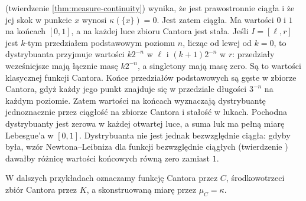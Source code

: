 \begin{przyklad}
(twierdzenie \ref{thm:measure-continuity}) wynika, że jest
prawostronnie ciągła i że jej skok w punkcie $x$ wynosi
$\kappa(\{x\})=0$. Jest zatem ciągła. Ma wartości $0$ i $1$
na końcach $[0,1]$, a na każdej luce zbioru Cantora jest stała. Jeśli $I=[\ell,r]$ jest $k$-tym przedziałem
podstawowym poziomu $n$, licząc od lewej od $k=0$,
to dystrybuanta przyjmuje wartości $k2^{-n}$ w $\ell$
i $(k+1)2^{-n}$ w $r$: przedziały wcześniejsze mają
łącznie masę $k2^{-n}$, a singletony mają masę zero.
Są to wartości klasycznej funkcji Cantora. Końce
przedziałów podstawowych są gęste w zbiorze Cantora,
gdyż każdy jego punkt znajduje się w przedziale
długości $3^{-n}$ na każdym poziomie. Zatem wartości
na końcach wyznaczają dystrybuantę jednoznacznie
przez ciągłość na zbiorze Cantora i stałość w lukach.
Pochodna dystrybuanty jest zerowa w każdej otwartej
luce, a suma luk ma pełną miarę Lebesgue'a w $[0,1]$.
Dystrybuanta nie jest jednak bezwzględnie ciągła:
gdyby była, wzór Newtona--Leibniza dla funkcji
bezwzględnie ciągłych
(twierdzenie )
dawałby różnicę wartości końcowych równą zero zamiast $1$.
\end{przyklad}

W dalszych przykładach oznaczamy funkcję Cantora przez $C$, środkowotrzeci zbiór Cantora przez $K$, a skonstruowaną miarę przez $\mu_C=\kappa$.

